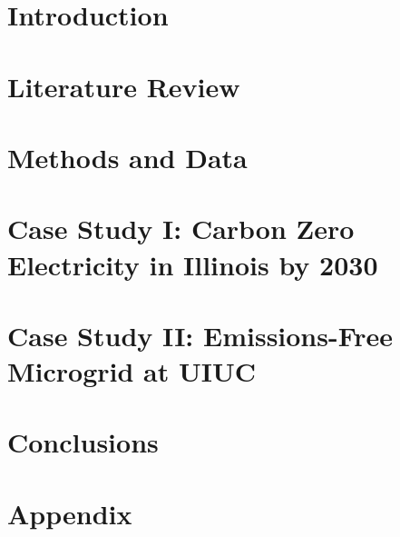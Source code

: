 \documentclass[edeposit,fullpage,11pt]{uiucthesis2018}
\begin{document}
%
%
%
\tableofcontents
\listoftables
\listoffigures
%
%
\pagebreak
\mainmatter
%

\glsresetall
\chapter{Introduction}

%
\chapter{Literature Review}

\label{chapter:litrev}

\chapter{Methods and Data}
\label{chapter:methods}


\chapter{Case Study I: Carbon Zero Electricity in Illinois by 2030}
\label{chapter:illinois}


 \chapter{Case Study II: Emissions-Free Microgrid at UIUC}
\label{chapter:uiuc}
 

\chapter{Conclusions}


\backmatter



%
\appendix
{}
\chapter*{Appendix}

%
\end{document}
